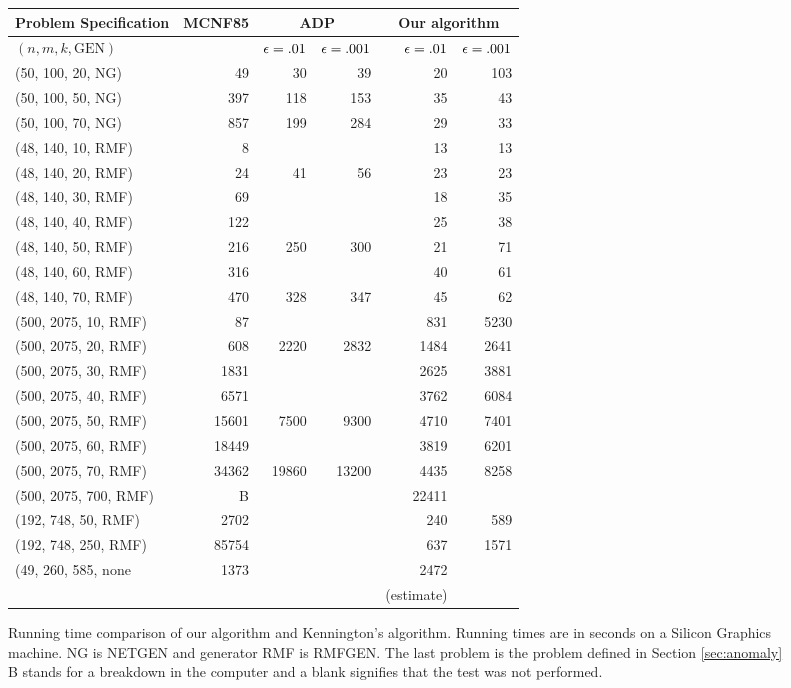 \begin{figure}
\begin{center}
\begin{tabular}{||l||r||r|r||r|r||} \hline
Problem Specification & MCNF85 & 
	\multicolumn{2}{c||}{ADP} & \multicolumn{2}{c||}{Our algorithm} \\ \hline
$(n,m,k,\mbox{GEN})$ & & $\epsilon=.01$ & $\epsilon = .001$ & $\epsilon=.01$ &
$\epsilon = .001$  \\
\hline
(50, 100, 20, NG) & 49 & 30 & 39 & 20 & 103 \\
(50, 100, 50, NG) & 397 & 118 & 153 &  35 & 43 \\
(50, 100, 70, NG) & 857 & 199 & 284 & 29 & 33 \\ \hline
(48, 140, 10, RMF) &  8 & & & 13 & 13 \\
(48, 140, 20, RMF) & 24 & 41 & 56 & 23 & 23 \\
(48, 140, 30, RMF) & 69 & & & 18 & 35 \\
(48, 140, 40, RMF) & 122 & & & 25 & 38 \\
(48, 140, 50, RMF) & 216 & 250 & 300 &  21 & 71 \\
(48, 140, 60, RMF) & 316 & & & 40 & 61 \\
(48, 140, 70, RMF) & 470 & 328 & 347 & 45 & 62 \\ \hline
(500, 2075, 10, RMF) & 87 & & & 831 & 5230   \\
(500, 2075, 20, RMF) & 608 & 2220 & 2832 & 1484 & 2641  \\
(500, 2075, 30, RMF) & 1831 & & & 2625 & 3881  \\
(500, 2075, 40, RMF) & 6571 & & & 3762 & 6084  \\
(500, 2075, 50, RMF) & 15601 & 7500 & 9300 & 4710 & 7401   \\
(500, 2075, 60, RMF) & 18449 & & & 3819 & 6201  \\
(500, 2075, 70, RMF) & 34362 & 19860 & 13200 & 4435 & 8258  \\ 
(500, 2075, 700, RMF) &  B & & &  22411 &  \\ \hline
(192, 748, 50, RMF) & 2702 & & & 240 & 589 \\
(192, 748, 250, RMF) & 85754 & & & 637 & 1571 \\ \hline
(49, 260, 585, none & 1373 & & & 2472 & \\
   &     &     &      &      (estimate) & \\
\hline
\end{tabular}
\end{center}
\caption{Running time comparison of our algorithm and Kennington's
algorithm.  Running times are in seconds on a Silicon Graphics machine.
 NG is NETGEN and generator RMF is \mbox{RMFGEN}. The last problem is the
problem defined in Section \protect\ref{sec:anomaly}   B stands for a
breakdown in the computer and a blank signifies that the test was not
performed.} 
\label{fig:running-times}
\end{figure}  

